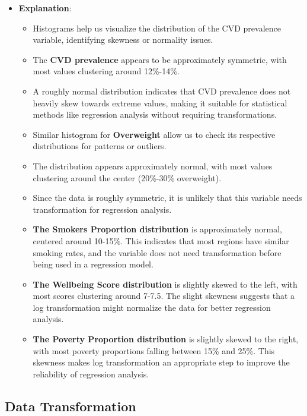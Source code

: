 \documentclass[
]{article}
\providecommand{\tightlist}{%
  \setlength{\itemsep}{0pt}\setlength{\parskip}{0pt}}
\begin{document}
\begin{itemize}
\tightlist
\item
  \textbf{Explanation}:

  \begin{itemize}
  \tightlist
  \item
    Histograms help us visualize the distribution of the CVD prevalence
    variable, identifying skewness or normality issues.
  \item
    The \textbf{CVD prevalence} appears to be approximately symmetric,
    with most values clustering around 12\%-14\%.
  \item
    A roughly normal distribution indicates that CVD prevalence does not
    heavily skew towards extreme values, making it suitable for
    statistical methods like regression analysis without requiring
    transformations.
  \item
    Similar histogram for \textbf{Overweight} allow us to check its
    respective distributions for patterns or outliers.
  \item
    The distribution appears approximately normal, with most values
    clustering around the center (20\%-30\% overweight).
  \item
    Since the data is roughly symmetric, it is unlikely that this
    variable needs transformation for regression analysis.
  \item
    \textbf{The Smokers Proportion distribution} is approximately
    normal, centered around 10-15\%. This indicates that most regions
    have similar smoking rates, and the variable does not need
    transformation before being used in a regression model.
  \item
    \textbf{The Wellbeing Score distribution} is slightly skewed to the
    left, with most scores clustering around 7-7.5. The slight skewness
    suggests that a log transformation might normalize the data for
    better regression analysis.
  \item
    \textbf{The Poverty Proportion distribution} is slightly skewed to
    the right, with most poverty proportions falling between 15\% and
    25\%. This skewness makes log transformation an appropriate step to
    improve the reliability of regression analysis.
  \end{itemize}
\end{itemize}

\subsection{Data Transformation}\label{data-transformation}
\end{document}
